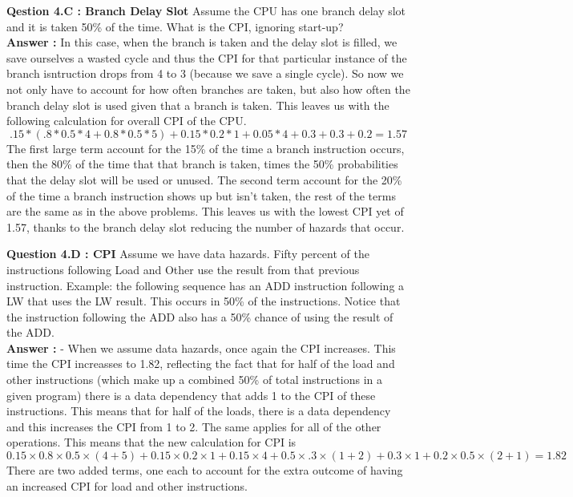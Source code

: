 \documentclass[a4paper,11pt]{article}
\newcommand{\answer}{\textbf{Answer : }}
\begin{document}
\item \textbf{Qestion 4.C : Branch Delay Slot} Assume the CPU has one branch delay slot and it is taken 50\% of the time. What is the CPI, ignoring start-up? \\
  \answer In this case, when the branch is taken and the delay slot is filled, we save ourselves a wasted cycle and thus the CPI for that particular instance of the branch isntruction drops from 4 to 3 (because we save a single cycle). So now we not only have to account for how often branches are taken, but also how often the branch delay slot is used given that a branch is taken. This leaves us with the following calculation for overall CPI of the CPU. 
  $$ .15*(.8*0.5*4 + 0.8*0.5*5) + 0.15*0.2*1 + 0.05*4 + 0.3 + 0.3 + 0.2 = 1.57$$
 The first large term account for the 15\% of the time a branch instruction occurs, then the 80\% of the time that that branch is taken, times the 50\% probabilities that the delay slot will be used or unused. The second term account for the 20\% of the time a branch instruction shows up but isn't taken, the rest of the terms are the same as in the above problems. This leaves us with the lowest CPI yet of 1.57, thanks to the branch delay slot reducing the number of hazards that occur. 


\item \textbf{Question 4.D : CPI} Assume we have data hazards. Fifty percent of the instructions following Load and Other use the result from that previous instruction. Example: the following sequence has an ADD instruction following a LW that uses the LW result. This occurs in 50\% of the instructions. Notice that the instruction following the ADD also has a 50\% chance of using the result of the ADD. \\
\answer - When we assume data hazards, once again the CPI increases. This time the CPI increasses to 1.82, reflecting the fact that for half of the load and other instructions (which make up a combined 50\% of total instructions in a given program) there is a data dependency that adds 1 to the CPI of these instructions. This means that for half of the loads, there is a data dependency and this increases the CPI from 1 to 2. The same applies for all of the other operations. This means that the new calculation for CPI is
$$ 0.15\times0.8\times0.5\times(4+5) + 0.15\times0.2\times1 + 0.15\times4 + 0.5\times.3\times (1+2) + 0.3\times1 + 0.2\times0.5\times(2+1) = 1.82$$
There are two added terms, one each to account for the extra outcome of having an increased CPI for load and other instructions.
\end{document}
